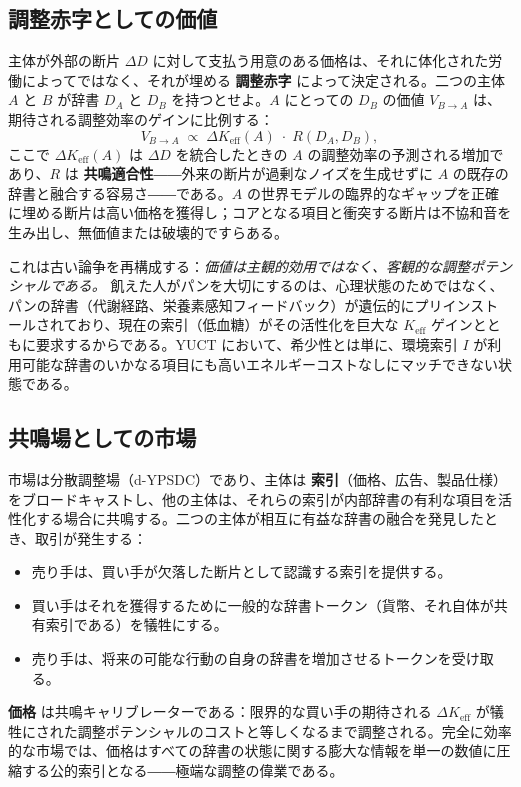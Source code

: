 \documentclass[12pt,a4paper]{article}
\newcommand{\Keff}{K_{\mathrm{eff}}}
\begin{document}
	\subsection{調整赤字としての価値}
	
	主体が外部の断片 $\Delta D$ に対して支払う用意のある価格は、それに体化された労働によってではなく、それが埋める \textbf{調整赤字} によって決定される。二つの主体 $A$ と $B$ が辞書 $D_A$ と $D_B$ を持つとせよ。$A$ にとっての $D_B$ の価値 $V_{B \rightarrow A}$ は、期待される調整効率のゲインに比例する：
	\[
	V_{B \rightarrow A} \; \propto \; \Delta\Keff(A) \; \cdot \; R(D_A, D_B),
	\]
	ここで $\Delta\Keff(A)$ は $\Delta D$ を統合したときの $A$ の調整効率の予測される増加であり、$R$ は \textbf{共鳴適合性}――外来の断片が過剰なノイズを生成せずに $A$ の既存の辞書と融合する容易さ――である。$A$ の世界モデルの臨界的なギャップを正確に埋める断片は高い価格を獲得し；コアとなる項目と衝突する断片は不協和音を生み出し、無価値または破壊的ですらある。
	
	これは古い論争を再構成する：\emph{価値は主観的効用ではなく、客観的な調整ポテンシャルである。} 飢えた人がパンを大切にするのは、心理状態のためではなく、パンの辞書（代謝経路、栄養素感知フィードバック）が遺伝的にプリインストールされており、現在の索引（低血糖）がその活性化を巨大な $K_{\mathrm{eff}}$ ゲインとともに要求するからである。YUCT において、希少性とは単に、環境索引 $I$ が利用可能な辞書のいかなる項目にも高いエネルギーコストなしにマッチできない状態である。
	
	\subsection{共鳴場としての市場}
	
	市場は分散調整場（d-YPSDC）であり、主体は \textbf{索引}（価格、広告、製品仕様）をブロードキャストし、他の主体は、それらの索引が内部辞書の有利な項目を活性化する場合に共鳴する。二つの主体が相互に有益な辞書の融合を発見したとき、取引が発生する：
	\begin{itemize}[leftmargin=*]
		\item 売り手は、買い手が欠落した断片として認識する索引を提供する。
		\item 買い手はそれを獲得するために一般的な辞書トークン（貨幣、それ自体が共有索引である）を犠牲にする。
		\item 売り手は、将来の可能な行動の自身の辞書を増加させるトークンを受け取る。
	\end{itemize}
	\textbf{価格} は共鳴キャリブレーターである：限界的な買い手の期待される $\Delta\Keff$ が犠牲にされた調整ポテンシャルのコストと等しくなるまで調整される。完全に効率的な市場では、価格はすべての辞書の状態に関する膨大な情報を単一の数値に圧縮する公的索引となる――極端な調整の偉業である。
	
\end{document}

